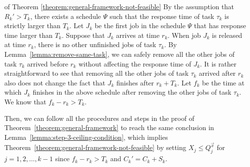 \begin{appProof}{of Theorem \ref{theorem:general-framework-not-feasible}}
  By the assumption that $R_k' > T_k$, there exists a schedule $\Psi$
  such that the response time of task $\tau_k$ is strictly larger than
  $T_k$. Let $J_k$ be the first job in the schedule $\Psi$ that has
  response time larger than $T_k$. Suppose that $J_{k}$ arrives at
  time $r_k$. When job $J_k$ is released at time $r_k$, there is no
  other unfinished jobs of task $\tau_k$. By
  Lemma~\ref{lemma:remove-same-task}, we can safely remove all the
  other jobs of task $\tau_k$ arrived before $r_k$ without affecting
  the response time of $J_k$. It is rather straightforward to see that
  removing all the other jobs of task $\tau_k$ arrived after $r_k$
  also does not change the fact that $J_k$ finishes after
  $r_k+T_k$. Let $f_k$ be the time at which $J_k$ finishes in the
  above schedule after removing the other jobs of task $\tau_k$. We
  know that $f_k - r_k > T_k$.

  Then, we can follow all the procedures and steps in the proof of
  Theorem~\ref{theorem:general-framework} to reach the same conclusion
  in Lemma~\ref{lemma:step-3-ceiling-condition}, which implies
  Theorem~\ref{theorem:general-framework-not-feasible} by setting $X_j
  \leq Q_j^{\vec{x}}$ for $j=1,2,\ldots,k-1$ since $f_k-r_k > T_k$ and
  $C_k'=C_k+S_k$.
\end{appProof}





